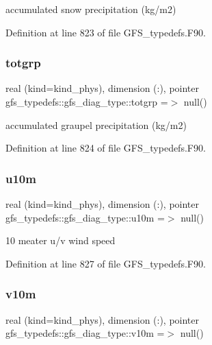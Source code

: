 accumulated snow precipitation (kg/m2) 



Definition at line 823 of file G\+F\+S\+\_\+typedefs.\+F90.

\mbox{\label{structgfs__typedefs_1_1gfs__diag__type_af68d9a60cda99a57bd48bf83789d13b3}} 
\subsubsection{totgrp}
{\footnotesize\ttfamily real (kind=kind\+\_\+phys), dimension (\+:), pointer gfs\+\_\+typedefs\+::gfs\+\_\+diag\+\_\+type\+::totgrp =$>$ null()}



accumulated graupel precipitation (kg/m2) 



Definition at line 824 of file G\+F\+S\+\_\+typedefs.\+F90.

\mbox{\label{structgfs__typedefs_1_1gfs__diag__type_a133c5f40267af5652041e46249463ecb}} 
\subsubsection{u10m}
{\footnotesize\ttfamily real (kind=kind\+\_\+phys), dimension   (\+:), pointer gfs\+\_\+typedefs\+::gfs\+\_\+diag\+\_\+type\+::u10m =$>$ null()}



10 meater u/v wind speed 



Definition at line 827 of file G\+F\+S\+\_\+typedefs.\+F90.

\mbox{\label{structgfs__typedefs_1_1gfs__diag__type_ad241e210d6c36a86ea7abdf2a8f5552c}} 
\subsubsection{v10m}
{\footnotesize\ttfamily real (kind=kind\+\_\+phys), dimension   (\+:), pointer gfs\+\_\+typedefs\+::gfs\+\_\+diag\+\_\+type\+::v10m =$>$ null()}



